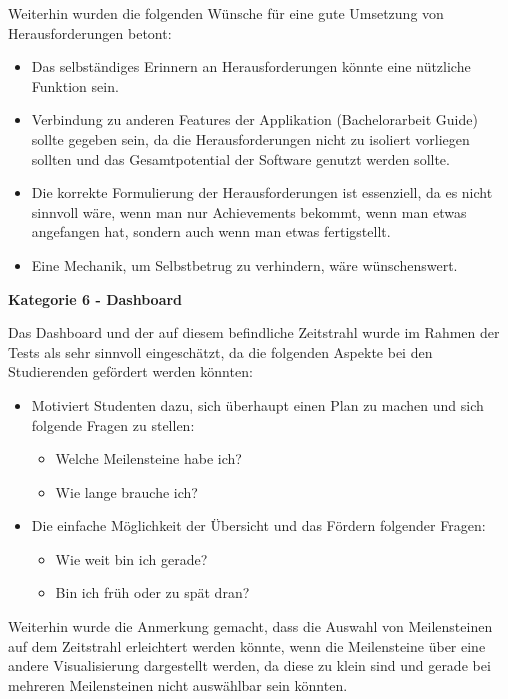 \documentclass[bibliography=totoc,listof=totoc,BCOR=5mm,DIV=12,oneside]{scrbook}
\begin{document}
\newpage
\par \bigskip Weiterhin wurden die folgenden Wünsche für eine gute Umsetzung von Herausforderungen betont:
\begin{itemize}
\item Das selbständiges Erinnern an Herausforderungen könnte eine nützliche Funktion sein.
\item Verbindung zu anderen Features der Applikation (Bachelorarbeit Guide) sollte gegeben sein, da die Herausforderungen nicht zu isoliert vorliegen sollten und das Gesamtpotential der Software genutzt werden sollte.
\item Die korrekte Formulierung der Herausforderungen ist essenziell, da es nicht sinnvoll wäre, wenn man nur Achievements bekommt, wenn man etwas angefangen hat, sondern auch wenn man etwas fertigstellt.
\item Eine Mechanik, um Selbstbetrug zu verhindern, wäre wünschenswert.
\end{itemize}

\par \bigskip \textbf{Kategorie 6 - Dashboard}
\par Das Dashboard und der auf diesem befindliche Zeitstrahl wurde im Rahmen der Tests als sehr sinnvoll eingeschätzt, da  die folgenden Aspekte bei den Studierenden gefördert werden könnten:

\begin{itemize}
\item Motiviert Studenten dazu, sich überhaupt einen Plan zu machen und sich folgende Fragen zu stellen:
\begin{itemize}
\item Welche Meilensteine habe ich?
\item Wie lange brauche ich?
\end{itemize}
\item Die einfache Möglichkeit der Übersicht und das Fördern folgender Fragen:
\begin{itemize}
\item Wie weit bin ich gerade?
\item Bin ich früh oder zu spät dran?
\end{itemize}
\end{itemize}

\par Weiterhin wurde die Anmerkung gemacht, dass die Auswahl von Meilensteinen auf dem Zeitstrahl erleichtert werden könnte, wenn die Meilensteine über eine andere Visualisierung dargestellt werden, da diese zu klein sind und gerade bei mehreren Meilensteinen nicht auswählbar sein könnten.
\end{document}
